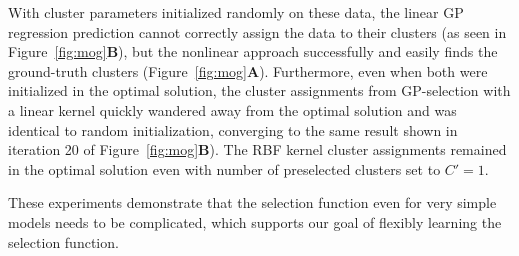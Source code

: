 With cluster parameters initialized randomly on these data, the linear GP regression prediction cannot correctly assign the data to their clusters (as seen in Figure~\ref{fig:mog}\textbf{B}), but the nonlinear approach successfully and easily finds the ground-truth clusters (Figure~\ref{fig:mog}\textbf{A}).
Furthermore, even when both were initialized in the optimal solution, the cluster assignments from GP-selection with a linear kernel quickly wandered away from the optimal solution and was identical to random initialization, converging to the same result shown in iteration 20 of Figure~\ref{fig:mog}\textbf{B}).
The RBF kernel cluster assignments remained in the optimal solution even with number of preselected clusters set to $C'=1$.


These experiments demonstrate that the selection function even for very simple models needs to be complicated, 
which supports our goal of flexibly learning the selection function.



%

